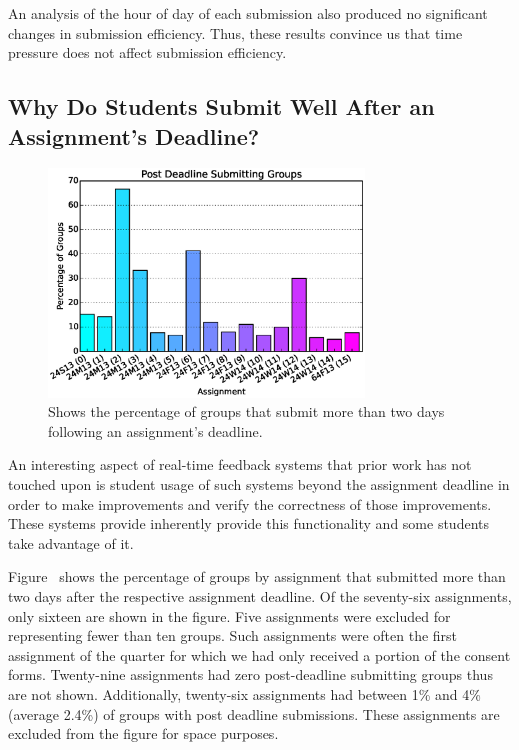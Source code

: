 An analysis of the hour of day of each submission also produced no significant
changes in submission efficiency. Thus, these results convince us that time
pressure does not affect submission efficiency.

\subsection{Why Do Students Submit Well After an Assignment's Deadline?}

\begin{figure}[!t]
\centering
\includegraphics[width=3.3in]{graphs/Post_Deadline_Submitting_Groups.eps}
\caption{Shows the percentage of groups that submit more than two days
  following an assignment's deadline.}
\end{figure}

An interesting aspect of real-time feedback systems that prior work has not
touched upon is student usage of such systems beyond the assignment deadline in
order to make improvements and verify the correctness of those
improvements. These systems provide inherently provide this functionality and
some students take advantage of it.

Figure~ shows the percentage of groups by assignment that
submitted more than two days after the respective assignment deadline. Of the
seventy-six assignments, only sixteen are shown in the figure. Five assignments
were excluded for representing fewer than ten groups. Such assignments were
often the first assignment of the quarter for which we had only received a
portion of the consent forms. Twenty-nine assignments had zero post-deadline
submitting groups thus are not shown. Additionally, twenty-six assignments had
between 1\% and 4\% (average 2.4\%) of groups with post deadline
submissions. These assignments are excluded from the figure for space purposes.

